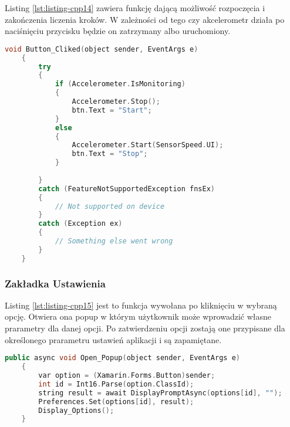 Listing \ref{lst:listing-cpp14} zawiera funkcję dającą możliwość rozpoczęcia i zakończenia liczenia kroków. W zależności od tego czy akcelerometr działa po naciśnięciu przycisku będzie on zatrzymany albo uruchomiony.
\begin{lstlisting}[caption=Rozpoczęcia i zakończenie liczenia kroków, label={lst:listing-cpp14}, language=C++]
	void Button_Cliked(object sender, EventArgs e) 
	{
		try
		{
			if (Accelerometer.IsMonitoring)
			{
				Accelerometer.Stop();
				btn.Text = "Start";
			}   
			else
			{
				Accelerometer.Start(SensorSpeed.UI);
				btn.Text = "Stop";
			}
			
		}
		catch (FeatureNotSupportedException fnsEx)
		{
			// Not supported on device
		}
		catch (Exception ex)
		{
			// Something else went wrong
		}
	}
\end{lstlisting}

\subsubsection{Zakładka Ustawienia} %

\hspace{0.60cm}Listing \ref{lst:listing-cpp15} jest to funkcja wywołana po kliknięciu w wybraną opcję. Otwiera ona popup w którym użytkownik może wprowadzić własne prarametry dla danej opcji. Po zatwierdzeniu opcji zostają one przypisane dla określonego prarametru ustawień aplikacji i są zapamiętane.
\begin{lstlisting}[caption=Otwarcie popup do wprowadzenia danych, label={lst:listing-cpp15}, language=C++]
	public async void Open_Popup(object sender, EventArgs e)
	{
		var option = (Xamarin.Forms.Button)sender;
		int id = Int16.Parse(option.ClassId);
		string result = await DisplayPromptAsync(options[id], "");
		Preferences.Set(options[id], result);
		Display_Options();
	}
\end{lstlisting}

